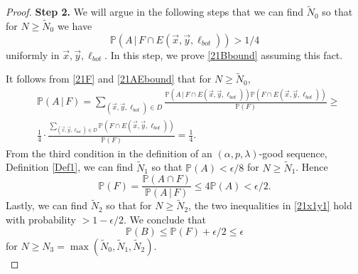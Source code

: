 \begin{proof}
		\noindent\textbf{Step 2.} We will argue in the following steps that we can find $\tilde{N}_0$ so that for $N\geq \tilde{N}_0$ we have
		\begin{equation}\label{21AEbound}
		\mathbb{P}(A\,|\, F\cap E(\vec{x},\vec{y},\ell_{bot})) > 1/4
		\end{equation}
		uniformly in $\vec{x},\vec{y},\ell_{bot}$. In this step, we prove \eqref{21Bbound} assuming this fact. 
		
		It follows from \eqref{21F} and \eqref{21AEbound} that for $N\geq\tilde{N}_0$,
		\begin{align*}
		&\mathbb{P}(A\,|\,F) = \sum_{(\vec{x},\vec{y},\ell_{bot})\in D} \frac{\mathbb{P}(A\,|\,F\cap E(\vec{x},\vec{y},\ell_{bot}))\mathbb{P}(F\cap E(\vec{x},\vec{y},\ell_{bot}))}{\mathbb{P}(F)} \geq \\ &\frac{1}{4}\cdot\frac{\sum_{(\vec{x},\vec{y},\ell_{bot})\in D} \mathbb{P}(F\cap E(\vec{x},\vec{y},\ell_{bot}))}{\mathbb{P}(F)} = \frac{1}{4}.
		\end{align*}
		From the third condition in the definition of an $(\alpha,p,\lambda)$-good sequence, Definition \ref{Def1}, we can find $\tilde{N}_1$ so that $\mathbb{P}(A) < \epsilon/8$ for $N\geq\tilde{N}_1$. Hence
		\[
		\mathbb{P}(F) = \frac{\mathbb{P}(A\cap F)}{\mathbb{P}(A\,|\,F)} \leq 4\mathbb{P}(A) < \epsilon/2.
		\]
		Lastly, we can find $\tilde{N}_2$ so that for $N\geq\tilde{N}_2$, the two inequalities in \eqref{21x1y1} hold with probability $>1-\epsilon/2$. We conclude that
		\[
		\mathbb{P}(B) \leq \mathbb{P}(F) + \epsilon/2 \leq \epsilon
		\]
		for $N\geq N_3 = \max(\tilde{N}_0,\tilde{N}_1,\tilde{N}_2)$.\\
		

\end{proof}
